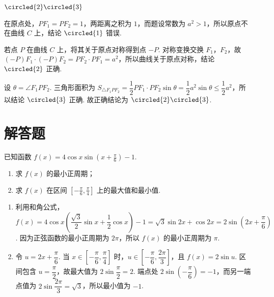 \begin{answer}
\(\circled{2}\circled{3}\)
\end{answer}

\begin{solution}
在原点处，\(PF_1=PF_2=1\)，两距离之积为 \(1\)，而题设常数为 \(a^2>1\)，所以原点不在曲线 \(C\) 上，结论 \(\circled{1}\) 错误.

若点 \(P\) 在曲线 \(C\) 上，将其关于原点对称得到点 \(-P\). 对称变换交换 \(F_1\)，\(F_2\)，故 \((-P)F_1\cdot(-P)F_2=PF_2\cdot PF_1=a^2\)，所以曲线关于原点对称，结论 \(\circled{2}\) 正确.

设 \(\theta=\angle F_1PF_2\). 三角形面积为
\(S_{\triangle F_1PF_2}=\dfrac12PF_1\cdot PF_2\sin\theta=\dfrac12a^2\sin\theta\leqslant\dfrac12a^2\)，所以结论 \(\circled{3}\) 正确. 故正确结论为 \(\circled{2}\circled{3}\).
\end{solution}

\section{解答题}

\begin{problem}
已知函数 \(f(x) = 4\cos x\sin \left(x + \frac{\pi}{6}\right) - 1\).

\begin{enumerate}
\item 求 \(f(x)\) 的最小正周期；
\item 求 \(f(x)\) 在区间 \(\left[-\frac{\pi}{6}, \frac{\pi}{4}\right]\) 上的最大值和最小值.
\end{enumerate}

\begin{solution}
\begin{enumerate}
\item 利用和角公式，
\(f(x)=4\cos x\left(\dfrac{\sqrt3}{2}\sin x+\dfrac12\cos x\right)-1=\sqrt3\sin 2x+\cos 2x=2\sin\left(2x+\dfrac{\pi}{6}\right)\).
因为正弦函数的最小正周期为 \(2\pi\)，所以 \(f(x)\) 的最小正周期为 \(\pi\).
\item 令 \(u=2x+\dfrac{\pi}{6}\). 当 \(x\in\left[-\dfrac{\pi}{6},\dfrac{\pi}{4}\right]\) 时，\(u\in\left[-\dfrac{\pi}{6},\dfrac{2\pi}{3}\right]\)，且 \(f(x)=2\sin u\). 区间包含 \(u=\dfrac\pi2\)，故最大值为 \(2\sin\dfrac\pi2=2\). 端点处 \(2\sin\left(-\dfrac\pi6\right)=-1\)，而另一端点值为 \(2\sin\dfrac{2\pi}3=\sqrt3\)，所以最小值为 \(-1\).
\end{enumerate}
\end{solution}
\end{problem}

